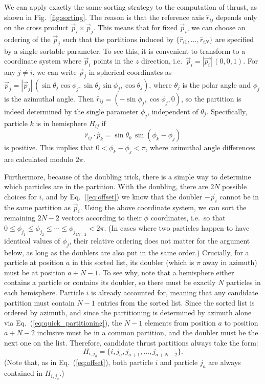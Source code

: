 \documentclass[aps,prd,twocolumn,superscriptaddress,preprintnumbers,nofootinbib,longbibliography,floatfix]{revtex4-1}
\DeclareRobustCommand{\Fig}[1]{Fig.~\ref{#1}}
\DeclareRobustCommand{\Eq}[1]{Eq.~(\ref{#1})}
\begin{document}
We can apply exactly the same sorting strategy to the computation of thrust, as shown in \Fig{fig:sorting}.
%
The reason is that the reference axis $\hat r_{ij}$ depends only on the cross product $\vec p_i \times \vec p_j$.
%
This means that for fixed $\vec p_i$, we can choose an ordering of the $\vec p_j$ such that the partitions induced by $\{\hat r_{i1},\ldots,\hat r_{iN}\}$ are specified by a single sortable parameter.
%
To see this, it is convenient to transform to a coordinate system where $\vec p_i$ points in the $z$ direction, i.e.\ $\vec p_i = |\vec{p_i}| \, (0,0,1)$.
%
For any $j\neq i$, we can write $\vec p_j$ in spherical coordinates as $\vec p_j = |\vec p_j| \, (\sin \theta_j  \cos \phi_j, \sin \theta_j  \sin \phi_j, \cos \theta_j )$, where $\theta_j$ is the polar angle and $\phi_j$ is the azimuthal angle.
%
Then $\hat r_{ij} = (-\sin \phi_j, \cos \phi_j ,0)$, so the partition is indeed determined by the single parameter $\phi_j$, independent of $\theta_j$.
%
Specifically, particle $k$ is in hemisphere $H_{ij}$ if
%
\begin{equation}
\label{eq:quick_partitioning}
\hat r_{ij}\cdot \hat p_k = \sin \theta_k \, \sin(\phi_k-\phi_j)
\end{equation}
%
is positive.
%
This implies that $0 < \phi_k-\phi_j < \pi$, where azimuthal angle differences are calculated modulo $2\pi$.


Furthermore, because of the doubling trick, there is a simple way to determine which particles are in the partition.
%
With the doubling, there are $2N$ possible choices for $i$, and by \Eq{eq:offset} we know that the doubler $-\vec{p}_i$ cannot be in the same partition as $\vec{p}_i$.
%
Using the above coordinate system, we can sort the remaining $2N-2$ vectors according to their $\phi$ coordinates, i.e.\ so that $0\leq \phi_{j_1} \leq \phi_{j_2} \leq \cdots \leq \phi_{j_{2N-2}} < 2\pi$.
%
(In cases where two particles happen to have identical values of $\phi_{j}$, their relative ordering does not matter for the argument below, as long as the doublers are also put in the same order.)
%
Crucially, for a particle at position $a$ in this sorted list, its doubler (which is $\pi$ away in azimuth) must be at position $a+N-1$.
%
To see why, note that a hemisphere either contains a particle or contains its doubler, so there must be exactly $N$ particles in each hemisphere.
%
Particle $i$ is already accounted for, meaning that any candidate partition must contain $N-1$ entries from the sorted list.
%
Since the sorted list is ordered by azimuth, and since the partitioning is determined by azimuth alone via \Eq{eq:quick_partitioning}, the $N-1$ elements from position $a$ to position $a+N-2$ inclusive must be in a common partition, and the doubler must be the next one on the list.
%
Therefore, candidate thrust partitions always take the form:
%
\begin{equation}
\label{eq:Hija_partition}
H_{i,j_a} = \{i,j_a,j_{a+1},\ldots,j_{a+N-2}\}.
\end{equation}
%
(Note that, as in \Eq{eq:offset}, both particle $i$ and particle $j_a$ are always contained in $H_{i,j_a}$.)
\end{document}
